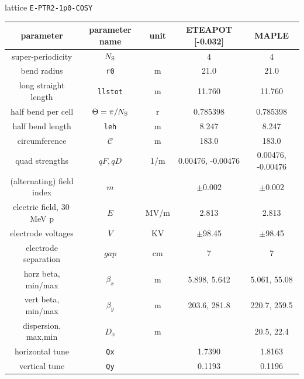 \documentclass[]{article}
\begin{document}
\begin{table}[hbp]
{lattice {\tt E-PTR2-1p0-COSY}} 
\medskip
\centering
\begin{tabular}{|c|c|c|c|c|}           \hline
parameter            & parameter name         & unit & ETEAPOT [-0.032] &    MAPLE      \\ \hline
super-periodicity    &  $N_{\rm S}$             &     &      4       &       4       \\
bend radius          &  {\tt r0}              &  m   &   21.0      &      21.0      \\
long straight length &  {\tt llstot}          &  m   &  11.760     &  11.760        \\
half bend per cell   &  $\Theta=\pi/N_{\rm S}$ &  r    &  0.785398   & 0.785398      \\
half bend length     & {\tt leh}              &  m   &  8.247      &  8.247        \\
circumference        & $\mathcal{C}$          &  m   &   183.0     &  183.0        \\
quad strengths       & $qF,qD$                & 1/m  & 0.00476, -0.00476 & 0.00476, -0.00476 \\ 
(alternating) field index &  $m$              &      &  $\pm0.002$ & $\pm0.002$    \\  \hline
electric field, 30\,MeV p & $E$                  & MV/m &  2.813      &  2.813              \\
electrode voltages   & $V$                    & KV   & $\pm$98.45  & $\pm$98.45    \\
electrode separation & $gap$                  & cm   &     7       &      7        \\  \hline
horz beta, min/max   & $\beta_x$              &  m   & 5.898, 5.642 & 5.061, 55.08   \\ 
vert beta, min/max   & $\beta_y$              &  m   & 203.6, 281.8 &  220.7, 259.5  \\ 
dispersion, max,min  & $D_x$                  &  m   &             &  20.5, 22.4   \\
horizontal tune      &  {\tt Qx}              &      &  1.7390     &    1.8163    \\ 
vertical tune        &  {\tt Qy}              &      &  0.1193     &    0.1196    \\
\hline
\end{tabular}
\end{table}
%

\clearpage 
\end{document}
